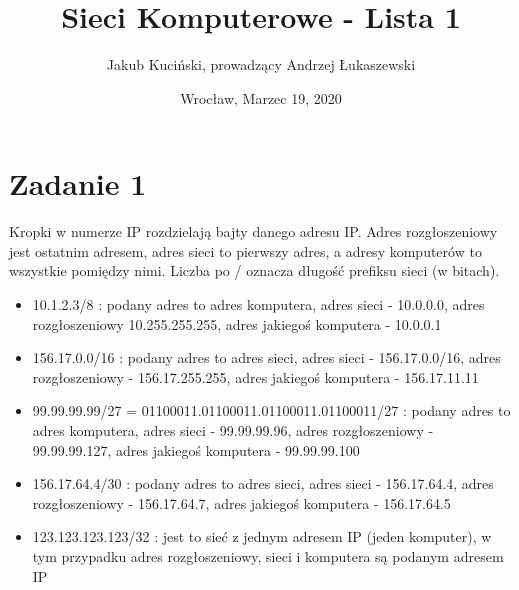 \documentclass[11pt,wide]{article}
\title{Sieci Komputerowe - Lista 1}
\date{Wrocław, Marzec 19, 2020}
\author{Jakub Kuciński, prowadzący Andrzej Łukaszewski}
\begin{document}
\maketitle
\thispagestyle{empty} 
\tableofcontents


\section{Zadanie 1}
Kropki w numerze IP rozdzielają bajty danego adresu IP. Adres rozgłoszeniowy jest ostatnim adresem, adres sieci to pierwszy adres, a adresy komputerów to wszystkie pomiędzy nimi. Liczba po / oznacza długość prefiksu sieci (w bitach).
\begin{itemize}
\item 10.1.2.3/8  : podany adres to adres komputera, adres sieci - 10.0.0.0, adres rozgłoszeniowy 10.255.255.255, adres jakiegoś komputera - 10.0.0.1
\item 156.17.0.0/16 : podany adres to adres sieci, adres sieci - 156.17.0.0/16, adres rozgłoszeniowy - 156.17.255.255, adres jakiegoś komputera - 156.17.11.11
\item 99.99.99.99/27 = 01100011.01100011.01100011.01100011/27 : podany adres to adres komputera, adres sieci - 99.99.99.96, adres rozgłoszeniowy - 99.99.99.127, adres jakiegoś komputera - 99.99.99.100
\item 156.17.64.4/30 : podany adres to adres sieci, adres sieci - 156.17.64.4, adres rozgłoszeniowy - 156.17.64.7, adres jakiegoś komputera - 156.17.64.5
\item 123.123.123.123/32 : jest to sieć z jednym adresem IP (jeden komputer), w tym przypadku adres rozgłoszeniowy, sieci i komputera są podanym adresem IP
\end{itemize}
\end{document}
